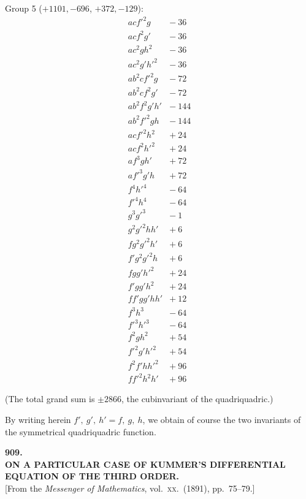 \documentclass[11pt,a4paper]{article}
\begin{document}
\noindent Group 5 ($+1101, -696$, $+372, -129$):
\[
\begin{array}{rr}
a c f'^2 g & -\ 36\\
a c f^2 g' & -\ 36\\
a c^2 g h^2 & -\ 36\\
a c^2 g' h'^2 & -\ 36\\
a b^2 c f'^2 g & -\ 72\\
a b^2 c f^2 g' & -\ 72\\
a b^2 f^2 g' h' & -\ 144\\
a b^2 f'^2 g h & -\ 144\\
a c f'^2 h^2 & +\ 24\\
a c f^2 h'^2 & +\ 24\\
a f^3 g h' & +\ 72\\
a f'^3 g' h & +\ 72\\
f^4 h'^4 & -\ 64\\
f'^4 h^4 & -\ 64\\
g^3 g'^3 & -\ 1\\
g^2 g'^2 h h' & +\ 6\\
f g^2 g'^2 h' & +\ 6\\
f' g^2 g'^2 h & +\ 6\\
f g g' h'^2 & +\ 24\\
f' g g' h^2 & +\ 24\\
f f' g g' h h' & +\ 12\\
f^3 h^3 & -\ 64\\
f'^3 h'^3 & -\ 64\\
f^2 g h^2 & +\ 54\\
f'^2 g' h'^2 & +\ 54\\
f^2 f' h h'^2 & +\ 96\\
f f'^2 h^2 h' & +\ 96
\end{array}
\]

\medskip
\noindent (The total grand sum is $\pm 2866$, the cubinvariant of the quadriquadric.)

By writing herein $f',\ g',\ h' = f,\ g,\ h$, we obtain of course the two invariants of the symmetrical quadriquadric function.

\clearpage

\begin{center}
{\large\bfseries 909.}\\[0.5em]
{\large\bfseries ON A PARTICULAR CASE OF KUMMER'S DIFFERENTIAL\\ EQUATION OF THE THIRD ORDER.}\\[0.5em]
\small [From the \emph{Messenger of Mathematics}, vol.\ \textsc{xx}.\ (1891), pp.\ 75--79.]
\end{center}
\medskip
\end{document}
